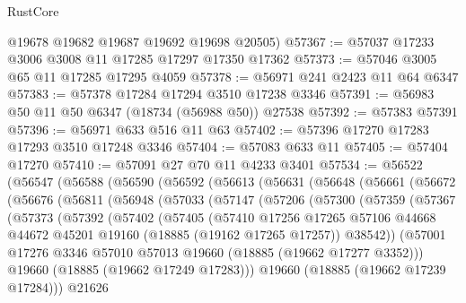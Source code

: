 \begin{lexlean}{RustCore}
\begin{coremodule}
      @19678
      @19682
      @19687
      @19692
      @19698
      @20505)
@57367 := @57037 @17233 @3006 @3008 @11 @17285 @17297 @17350 @17362
@57373 := @57046 @3005 @65 @11 @17285 @17295 @4059
@57378 := @56971 @241 @2423 @11 @64 @6347
@57383 := @57378 @17284 @17294 @3510 @17238 @3346
@57391 := @56983 @50 @11 @50 @6347 (@18734 (@56988 @50)) @27538
@57392 := @57383 @57391
@57396 := @56971 @633 @516 @11 @63
@57402 := @57396 @17270 @17283 @17293 @3510 @17248 @3346
@57404 := @57083 @633 @11
@57405 := @57404 @17270
@57410 := @57091 @27 @70 @11 @4233 @3401
@57534 := @56522
    (@56547
      (@56588
        (@56590
          (@56592
            (@56613
              (@56631
                (@56648
                  (@56661
                    (@56672
                      (@56676
                        (@56811
                          (@56948
                            (@57033
                              (@57147
                                (@57206
                                  (@57300
                                    (@57359
                                      (@57367
                                        (@57373
                                          (@57392
                                            (@57402
                                              (@57405
                                                (@57410
                                                  @17256
                                                  @17265
                                                  @57106
                                                  @44668
                                                  @44672
                                                  @45201
                                                  @19160
                                                  (@18885 (@19162 @17265 @17257))
                                                  @38542))
                                              (@57001
                                                @17276
                                                @3346
                                                @57010
                                                @57013
                                                @19660
                                                (@18885 (@19662 @17277 @3352)))
                                              @19660
                                              (@18885 (@19662 @17249 @17283)))
                                            @19660
                                            (@18885 (@19662 @17239 @17284)))
                                          @21626

\end{coremodule}
\end{lexlean}
